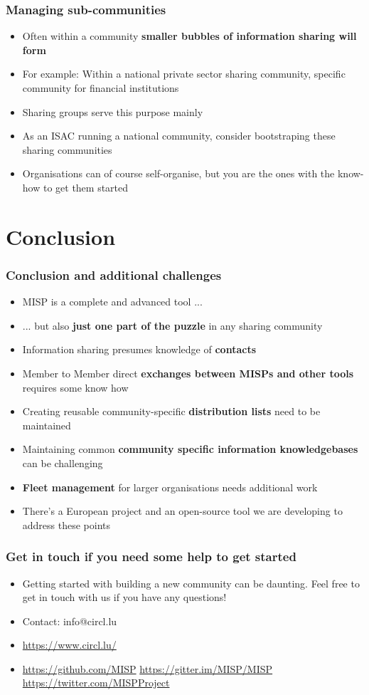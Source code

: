 \begin{frame}
\frametitle{Managing sub-communities}
\begin{itemize}
    \item Often within a community \textbf{smaller bubbles of information sharing will form}
	\item For example: Within a national private sector sharing community, specific community for financial institutions
	\item Sharing groups serve this purpose mainly
	\item As an ISAC running a national community, consider bootstraping these sharing communities
	\item Organisations can of course self-organise, but you are the ones with the know-how to get them started
\end{itemize}
\end{frame}

\section{Conclusion}

\begin{frame}
	\frametitle{Conclusion and additional challenges}
	\begin{itemize}
		\item MISP is a complete and advanced tool ...
		\item ... but also \textbf{just one part of the puzzle} in any sharing community
		\item Information sharing presumes knowledge of \textbf{contacts}
		\item Member to Member direct \textbf{exchanges between MISPs and other tools} requires some know how
		\item Creating reusable community-specific \textbf{distribution lists} need to be maintained
		\item Maintaining common \textbf{community specific information knowledgebases} can be challenging
		\item \textbf{Fleet management} for larger organisations needs additional work
        \item There's a European project and an open-source tool we are developing to address these points
	\end{itemize}
\end{frame}

\begin{frame}
	\frametitle{Get in touch if you need some help to get started}
	\begin{itemize}
		\item Getting started with building a new community can be daunting. Feel free to get in touch with us if you have any questions!
		\item Contact: info@circl.lu
		\item \url{https://www.circl.lu/}
		\item \url{https://github.com/MISP}  \url{https://gitter.im/MISP/MISP}  \url{https://twitter.com/MISPProject}
	\end{itemize}
\end{frame}
